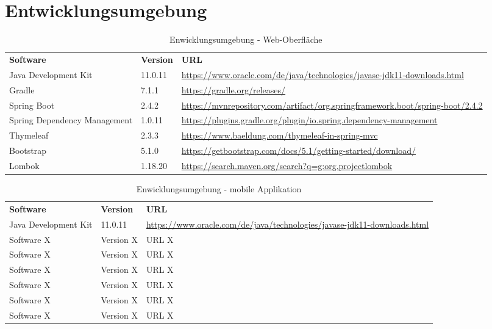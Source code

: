 \newpage
\section{Entwicklungsumgebung}\label{sec:entwicklungsumgebung}

\begin{table}[h]
	\centering
	\begin{tabularx}{\textwidth}{l l X}
		\rowcolor[HTML]{C0C0C0} 
		\textbf{Software} & \textbf{Version} & \textbf{URL} \\
		Java Development Kit & 11.0.11 & \url{https://www.oracle.com/de/java/technologies/javase-jdk11-downloads.html} \\
		\rowcolor[HTML]{E7E7E7} 
		Gradle & 7.1.1 & \url{https://gradle.org/releases/} \\
		Spring Boot & 2.4.2 & \url{https://mvnrepository.com/artifact/org.springframework.boot/spring-boot/2.4.2} \\
		\rowcolor[HTML]{E7E7E7} 
			Spring Dependency Management & 1.0.11 & \url{https://plugins.gradle.org/plugin/io.spring.dependency-management} \\
		Thymeleaf & 2.3.3 & \url{https://www.baeldung.com/thymeleaf-in-spring-mvc} \\
		Bootstrap & 5.1.0 & \url{https://getbootstrap.com/docs/5.1/getting-started/download/} \\
		\rowcolor[HTML]{E7E7E7} 
		Lombok & 1.18.20 & \url{https://search.maven.org/search?q=g:org.projectlombok} \\
	\end{tabularx}
	\caption{Enwicklungsumgebung - Web-Oberfl\"ache}
	\label{table:entwicklungsumgebung}
\end{table}

\begin{table}[h]
	\centering
	\begin{tabularx}{\textwidth}{l l X}
		\rowcolor[HTML]{C0C0C0} 
		\textbf{Software} & \textbf{Version} & \textbf{URL} \\
		Java Development Kit & 11.0.11 & \url{https://www.oracle.com/de/java/technologies/javase-jdk11-downloads.html} \\
		\rowcolor[HTML]{E7E7E7} 
		Software X & Version X & URL X \\
		Software X & Version X & URL X \\
		\rowcolor[HTML]{E7E7E7} 
		Software X & Version X & URL X \\
		Software X & Version X & URL X \\
		\rowcolor[HTML]{E7E7E7} 
		Software X & Version X & URL X \\
		Software X & Version X & URL X \\
	\end{tabularx}
	\caption{Enwicklungsumgebung - mobile Applikation}
	\label{table:entwicklungsumgebung}
\end{table}